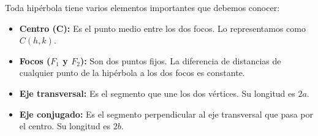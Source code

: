 \documentclass[12pt,a4paper]{article}
\begin{document}
	\noindent
	\begin{minipage}[t]{0.52\textwidth}
	Toda hipérbola tiene varios elementos importantes que debemos conocer:

	\begin{itemize}
		\item \textbf{Centro (C):} Es el punto medio entre los dos focos. Lo representamos como $C(h,k)$.

		\item \textbf{Focos ($F_1$ y $F_2$):} Son dos puntos fijos. La diferencia de distancias de cualquier punto de la hipérbola a los dos focos es constante.

		\item \textbf{Eje transversal:} Es el segmento que une los dos vértices. Su longitud es $2a$.

		\item \textbf{Eje conjugado:} Es el segmento perpendicular al eje transversal que pasa por el centro. Su longitud es $2b$.

	\end{itemize}
	\end{minipage}%
	\hfill
\end{document}
